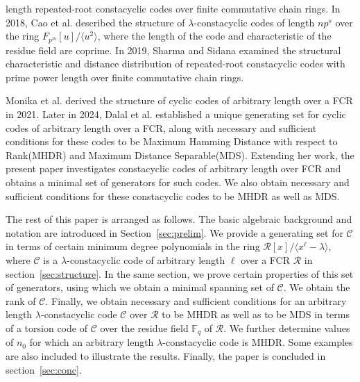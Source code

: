 \documentclass[12pt,a4paper]{article}
\begin{document}
length repeated-root constacyclic codes over finite commutative chain rings. In 2018, Cao et al. \cite{cao2018constacyclic} described the structure of $\lambda$-constacyclic codes of length $np^s$ over the ring $F_{p^m}[u]/\langle u^2 \rangle$, where the length of the code and characteristic of the residue field are coprime. In 2019, Sharma and Sidana \cite{sharma2018structure} examined the structural characteristic and distance distribution of repeated-root constacyclic codes with prime power length over finite commutative chain rings.

Monika et al. \cite{monika2021cyclic} derived the structure of cyclic codes of arbitrary length over a FCR in 2021. Later in 2024, Dalal et al. \cite{dalal2024mds} established a unique generating set for cyclic codes of arbitrary length over a FCR, along with necessary and sufficient conditions for these codes to be Maximum Hamming Distance with respect to Rank(MHDR) and Maximum Distance Separable(MDS). Extending her work, the present paper investigates constacyclic codes of arbitrary length over FCR and obtains a minimal set of generators for such codes. We also obtain necessary and sufficient conditions for these constacyclic codes to be MHDR as well as MDS.
 
The rest of this paper is arranged as follows. The basic algebraic background and notation are introduced in Section~\ref{sec:prelim}. We provide a generating set for $\mathcal{C}$ in terms of certain minimum degree polynomials in the ring $\mathcal{R}[x]/ \langle x^{\ell}-\lambda \rangle$, where $\mathcal{C}$ is a $\lambda$-constacyclic code of arbitrary length $\ell$ over a FCR $\mathcal{R}$ in section~\ref{sec:structure}. In the same section, we prove certain properties of this set of generators, using which we obtain a minimal spanning set of $\mathcal{C}$. We obtain the rank of $\mathcal{C}$. Finally, we obtain necessary and sufficient conditions for an arbitrary length $\lambda$-constacyclic code $\mathcal{C}$ over $\mathcal{R}$ to be MHDR as well as to be MDS in terms of a torsion code of $\mathcal{C}$ over the residue field $\mathbb{F}_q$ of $\mathcal{R}$. We further determine values of $n_0$ for which an arbitrary length $\lambda$-constacyclic code is MHDR. Some examples are also included to illustrate the results. Finally, the paper is concluded in section~\ref{sec:conc}.
\end{document}
